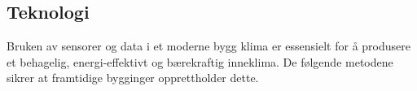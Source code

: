\subsection{Teknologi}


Bruken av sensorer og data i et moderne bygg klima er essensielt for å produsere et behagelig, energi-effektivt og bærekraftig inneklima. De følgende metodene sikrer at framtidige bygginger opprettholder dette.

